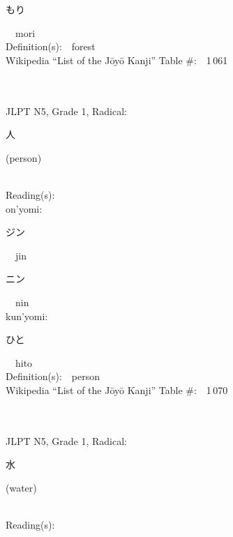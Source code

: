 \begin{multicols}{2}
{\hspace*{2em}}{\begin{CJK}{UTF8}{min} もり \end{CJK}}\ \ mori\ \ \\
Definition(s):\ \ forest \\
Wikipedia ``List of the J\=oy\=o Kanji'' Table \#:\ \ 1\,061 \\
\ \ \\
{\fontsize{34pt}{40pt}  }\ \ \\  %
{JLPT N5, Grade 1, Radical:\ \ {\begin{CJK}{UTF8}{min} 人 \end{CJK}} (person) } \\
Reading(s):\ \ \\
{\hspace*{1em}}on'yomi:\ \ \\
{\hspace*{2em}}{\begin{CJK}{UTF8}{min} ジン \end{CJK}}\ \ jin\ \ \\
{\hspace*{2em}}{\begin{CJK}{UTF8}{min} ニン \end{CJK}}\ \ nin\ \ \\
{\hspace*{1em}}kun'yomi:\ \ \\
{\hspace*{2em}}{\begin{CJK}{UTF8}{min} ひと \end{CJK}}\ \ hito\ \ \\
Definition(s):\ \ person \\
Wikipedia ``List of the J\=oy\=o Kanji'' Table \#:\ \ 1\,070 \\
\ \ \\
{\fontsize{34pt}{40pt}  }\ \ \\  %
{JLPT N5, Grade 1, Radical:\ \ {\begin{CJK}{UTF8}{min} 水 \end{CJK}} (water) } \\
Reading(s):\ \ \\

\end{multicols}
